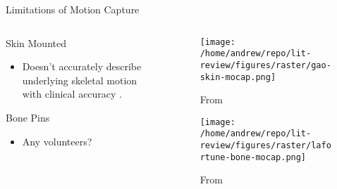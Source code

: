 \documentclass[presentation, aspectratio=1610]{beamer}
\begin{document}
\begin{frame}[label={sec:orgad767cf}]{Limitations of Motion Capture}
\begin{columns}
\begin{column}{0.5\columnwidth}
Skin Mounted
\begin{itemize}
\item Doesn't accurately describe underlying skeletal motion with clinical accuracy \autocites{gaoInvestigationSoftTissue2008}[][]{kuoInfluenceSoftTissue2011}[][]{linEffectsSoftTissue2016}.
\end{itemize}
Bone Pins
\begin{itemize}
\item Any volunteers?
\end{itemize}
\end{column}

\begin{column}{0.6\columnwidth}
\begin{figure}[htbp]
\centering
\texttt{[image: /home/andrew/repo/lit-review/figures/raster/gao-skin-mocap.png]}
\caption{From \autocite{gaoInvestigationSoftTissue2008}}
\end{figure}
\vspace{-0.25in}
\begin{figure}[htbp]
\centering
\texttt{[image: /home/andrew/repo/lit-review/figures/raster/lafortune-bone-mocap.png]}
\caption{From \autocite{lafortuneThreedimensionalKinematicsHuman1992}}
\end{figure}
\end{column}
\end{columns}
\end{frame}
\end{document}
